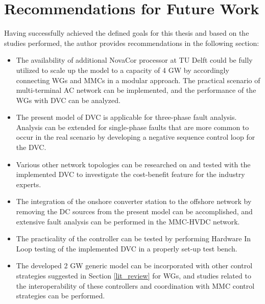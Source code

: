 \section{Recommendations for Future Work}
Having successfully achieved the defined goals for this thesis and based on the studies performed, the author provides recommendations in the following section:  
\begin{itemize}
    \item The availability of additional NovaCor processor at TU Delft could be fully utilized to scale up the model to a capacity of 4 GW by accordingly connecting \gls{WG}s and \gls{MMC}s in a modular approach. The practical scenario of multi-terminal \gls{AC} network can be implemented, and the performance of the \gls{WG}s with \gls{DVC} can be analyzed.
    \item The present model of \gls{DVC} is applicable for three-phase fault analysis. Analysis can be extended for single-phase faults that are more common to occur in the real scenario by developing a negative sequence control loop for the \gls{DVC}.
    \item Various other network topologies can be researched on and tested with the implemented \gls{DVC} to investigate the cost-benefit feature for the industry experts. 
    \item The integration of the onshore converter station to the offshore network by removing the \gls{DC} sources from the present model can be accomplished, and extensive fault analysis can be performed in the \gls{MMC}-\gls{HVDC} network.
    \item The practicality of the controller can be tested by performing Hardware In Loop testing of the implemented \gls{DVC} in a properly set-up test bench.
    \item The developed 2 GW generic model can be incorporated with other control strategies suggested in Section \ref{lit_review} for \gls{WG}s, and studies related to the interoperability of these controllers and coordination with \gls{MMC} control strategies can be performed.
\end{itemize}
